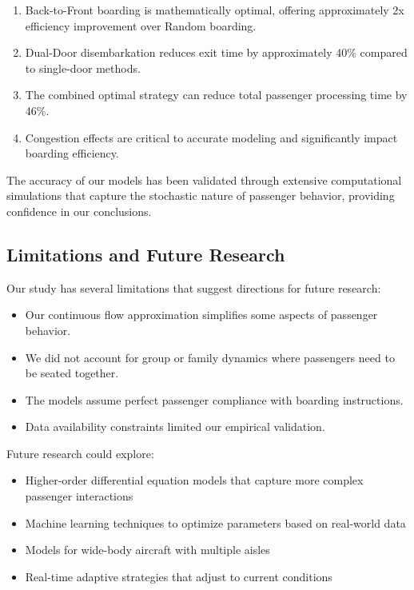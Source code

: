\documentclass[12pt,a4paper]{article}
\begin{document}
\begin{enumerate}
    \item Back-to-Front boarding is mathematically optimal, offering approximately 2x efficiency improvement over Random boarding.
    \item Dual-Door disembarkation reduces exit time by approximately 40\% compared to single-door methods.
    \item The combined optimal strategy can reduce total passenger processing time by 46\%.
    \item Congestion effects are critical to accurate modeling and significantly impact boarding efficiency.
\end{enumerate}

The accuracy of our models has been validated through extensive computational simulations that capture the stochastic nature of passenger behavior, providing confidence in our conclusions.

\subsection{Limitations and Future Research}
Our study has several limitations that suggest directions for future research:
\begin{itemize}
    \item Our continuous flow approximation simplifies some aspects of passenger behavior.
    \item We did not account for group or family dynamics where passengers need to be seated together.
    \item The models assume perfect passenger compliance with boarding instructions.
    \item Data availability constraints limited our empirical validation.
\end{itemize}

Future research could explore:
\begin{itemize}
    \item Higher-order differential equation models that capture more complex passenger interactions
    \item Machine learning techniques to optimize parameters based on real-world data
    \item Models for wide-body aircraft with multiple aisles
    \item Real-time adaptive strategies that adjust to current conditions
\end{itemize}
\end{document}
